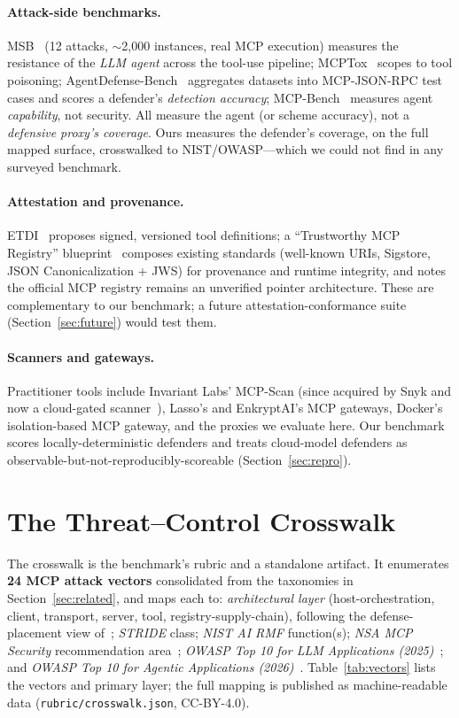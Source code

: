 \documentclass[sigconf,review,anonymous]{acmart}
\begin{document}
\paragraph{Attack-side benchmarks.} MSB~\cite{msb2510} (12 attacks, $\sim$2{,}000 instances, real MCP execution) measures the resistance of the \emph{LLM agent} across the tool-use pipeline; MCPTox~\cite{mcptox2508} scopes to tool poisoning; AgentDefense-Bench~\cite{agentdefensebench} aggregates datasets into MCP-JSON-RPC test cases and scores a defender's \emph{detection accuracy}; MCP-Bench~\cite{mcpbench2508} measures agent \emph{capability}, not security. All measure the agent (or scheme accuracy), not a \emph{defensive proxy's coverage}. Ours measures the defender's coverage, on the full mapped surface, crosswalked to NIST/OWASP---which we could not find in any surveyed benchmark.

\paragraph{Attestation and provenance.} ETDI~\cite{etdi2506} proposes signed, versioned tool definitions; a ``Trustworthy MCP Registry'' blueprint~\cite{trustreg2026} composes existing standards (well-known URIs, Sigstore, JSON Canonicalization + JWS) for provenance and runtime integrity, and notes the official MCP registry remains an unverified pointer architecture. These are complementary to our benchmark; a future attestation-conformance suite (Section~\ref{sec:future}) would test them.

\paragraph{Scanners and gateways.} Practitioner tools include Invariant Labs' MCP-Scan (since acquired by Snyk and now a cloud-gated scanner~\cite{snykagentscan}), Lasso's and EnkryptAI's MCP gateways, Docker's isolation-based MCP gateway, and the proxies we evaluate here. Our benchmark scores locally-deterministic defenders and treats cloud-model defenders as observable-but-not-reproducibly-scoreable (Section~\ref{sec:repro}).

\section{The Threat--Control Crosswalk}\label{sec:crosswalk}
The crosswalk is the benchmark's rubric and a standalone artifact. It enumerates \textbf{24 MCP attack vectors} consolidated from the taxonomies in Section~\ref{sec:related}, and maps each to: \emph{architectural layer} (host-orchestration, client, transport, server, tool, registry-supply-chain), following the defense-placement view of~\cite{mcpdpt2604}; \emph{STRIDE} class; \emph{NIST AI RMF} function(s); \emph{NSA MCP Security} recommendation area~\cite{nsamcp2026}; \emph{OWASP Top 10 for LLM Applications (2025)}~\cite{owaspllm2025}; and \emph{OWASP Top 10 for Agentic Applications (2026)}~\cite{owaspasi2026}. Table~\ref{tab:vectors} lists the vectors and primary layer; the full mapping is published as machine-readable data (\texttt{rubric/crosswalk.json}, CC-BY-4.0).
\end{document}
